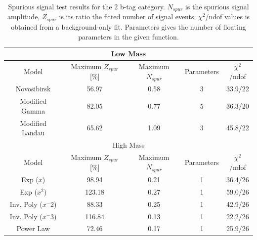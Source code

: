 \begin{table}[!h]
  \centering
  \caption[Spurious signal test results for the 2 b-tag category]{Spurious signal test results for the 2 b-tag category. $N_{spur}$ is the spurious signal amplitude, $Z_{spur}$ is its ratio the fitted number of signal events. $\chi^2$/ndof values is obtained from a background-only fit. Parameters gives the number of floating parameters in the given function.}
  \label{tab:spurious-signal-2}
  \begin{tabular}{|c|c|c|c|c|}
    \hline
    \multicolumn{5}{|c|}{Low Mass}\\
    \hline
    Model     &   Maximum $Z_{spur}$ [\%]      &      Maximum $N_{spur}$      &   Parameters     &    $\chi^2$/ndof \\
    \hline
    Novosibirsk        & 56.97    &  0.58   & 3  & 33.9/22 \\
    Modified Gamma     & 82.05    &  0.77   & 5  & 36.3/20 \\
    Modified Landau    & 65.62    &  1.09   & 3  & 45.8/22 \\
    \hline
    \multicolumn{5}{|c|}{High Mass}\\
    \hline
    Model     &   Maximum $Z_{spur}$ [\%]      &      Maximum $N_{spur}$      &   Parameters     &    $\chi^2$/ndof \\
    \hline
    Exp ($x$)             &  98.94   & 0.21   & 1  & 36.4/26 \\
    Exp ($x^2$)           &  123.18   & 0.27   & 1  & 59.0/26 \\
    Inv. Poly ($x^-2$)    &  88.33   & 0.25   & 1  & 42.9/26 \\
    Inv. Poly ($x^-3$)    &  116.84   & 0.13   & 1  & 22.2/26 \\
    Power Law             &  72.46   & 0.17   & 1  & 25.9/26 \\
    \hline    
  \end{tabular}
\end{table}


